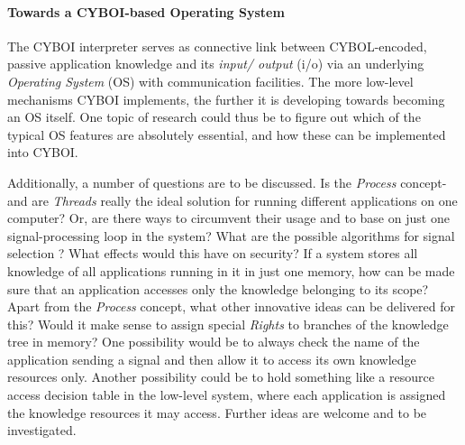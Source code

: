 %
%
%
%
%
%
%

\paragraph{Towards a CYBOI-based Operating System}
\label{cyboi_operating_system_heading}

The CYBOI interpreter serves as connective link between CYBOL-encoded, passive
application knowledge and its \emph{input/ output} (i/o) via an underlying
\emph{Operating System} (OS) with communication facilities. The more low-level
mechanisms CYBOI implements, the further it is developing towards becoming an
OS itself. One topic of research could thus be to figure out which of the
typical OS features \cite[p. 80]{tanenbaum2001} are absolutely essential, and
how these can be implemented into CYBOI.

Additionally, a number of questions are to be discussed. Is the \emph{Process}
concept- and are \emph{Threads} really the ideal solution for running different
applications on one computer? Or, are there ways to circumvent their usage and
to base on just one signal-processing loop in the system? What are the possible
algorithms for signal selection \cite[p. 101]{kuehnel}? What effects would this
have on security? If a system stores all knowledge of all applications running
in it in just one memory, how can be made sure that an application accesses
only the knowledge belonging to its scope? Apart from the \emph{Process}
concept, what other innovative ideas can be delivered for this? Would it make
sense to assign special \emph{Rights} to branches of the knowledge tree in
memory? One possibility would be to always check the name of the application
sending a signal and then allow it to access its own knowledge resources only.
Another possibility could be to hold something like a resource access decision
table in the low-level system, where each application is assigned the knowledge
resources it may access. Further ideas are welcome and to be investigated.

